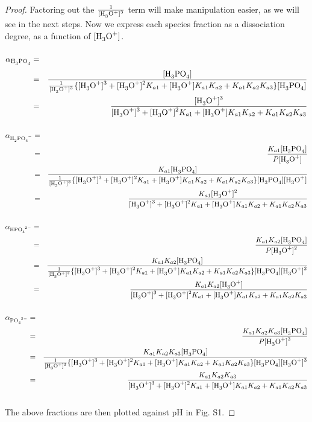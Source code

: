 \documentclass[a4paper,12pt,twocolumn]{article}
\begin{document}
\begin{proof}
	Factoring out the $\frac{1}{\ce{[H3O+]^3}}$ term will make manipulation easier, as we will see in the next steps. Now we express each species fraction as a dissociation degree, as a function of $\ce{[H3O+]}$.

 	\begin{eqnarray}
 		\alpha_{\ce{H3PO4}} & = & \frac{\ce{[H3PO4]}}{P} \hspace{-10cm} \nonumber \\
 		& = & \frac{\ce{[H3PO4]}}{\frac{1}{\ce{[H3O+]^3}} \{ \ce{[H3O+]^3} + \ce{[H3O+]^2}K_{a1} + \ce{[H3O+]}K_{a1}K_{a2} + K_{a1}K_{a2}K_{a3}\}\ce{[H3PO4]}} \nonumber \\
 		& = & \frac{\ce{[H3O+]^3}}{\ce{[H3O+]^3} + \ce{[H3O+]^2}K_{a1} + \ce{[H3O+]}K_{a1}K_{a2} + K_{a1}K_{a2}K_{a3}}
 		\end{eqnarray}

 	\begin{eqnarray}
 		\alpha_{\ce{H2PO4^{-}}} & = & \frac{\ce{[H2PO4^{-}]}}{P} \hspace{-10cm} \nonumber  \\
 		& = & \frac{K_{a1}\ce{[H3PO4]}}{P\ce{[H3O+]}} \nonumber \\
 		& = & \frac{K_{a1}\ce{[H3PO4]}}{\frac{1}{\ce{[H3O+]^3}} \{ \ce{[H3O+]^3} + \ce{[H3O+]^2}K_{a1} + \ce{[H3O+]}K_{a1}K_{a2} + K_{a1}K_{a2}K_{a3}\}\ce{[H3PO4][H3O+]}} \nonumber \\
 		& = & \frac{K_{a1}\ce{[H3O+]^2}}{\ce{[H3O+]^3} + \ce{[H3O+]^2}K_{a1} + \ce{[H3O+]}K_{a1}K_{a2} + K_{a1}K_{a2}K_{a3}}
 		\end{eqnarray}

 	\begin{eqnarray}
 		\alpha_{\ce{HPO4^{2-}}} & = & \frac{\ce{[HPO4^{2-}]}}{P} \hspace{-10cm} \nonumber  \\
 		& = & \frac{K_{a1}K_{a2}\ce{[H3PO4]}}{P\ce{[H3O+]^2}} \nonumber \\
 		& = & \frac{K_{a1}K_{a2}\ce{[H3PO4]}}{\frac{1}{\ce{[H3O+]^3}} \{ \ce{[H3O+]^3} + \ce{[H3O+]^2}K_{a1} + \ce{[H3O+]}K_{a1}K_{a2} + K_{a1}K_{a2}K_{a3}\}\ce{[H3PO4][H3O+]^2}} \nonumber \\
 		& = & \frac{K_{a1}K_{a2}\ce{[H3O+]}}{\ce{[H3O+]^3} + \ce{[H3O+]^2}K_{a1} + \ce{[H3O+]}K_{a1}K_{a2} + K_{a1}K_{a2}K_{a3}}
 		\end{eqnarray}

 	\begin{eqnarray}
 		\alpha_{\ce{PO4^{3-}}} & = & \frac{\ce{[PO4^{3-}]}}{P} \hspace{-10cm} \nonumber  \\
 		& = & \frac{K_{a1}K_{a2}K_{a3}\ce{[H3PO4]}}{P\ce{[H3O+]^3}} \nonumber \\
 		& = & \frac{K_{a1}K_{a2}K_{a3}\ce{[H3PO4]}}{\frac{1}{\ce{[H3O+]^3}} \{ \ce{[H3O+]^3} + \ce{[H3O+]^2}K_{a1} + \ce{[H3O+]}K_{a1}K_{a2} + K_{a1}K_{a2}K_{a3}\}\ce{[H3PO4][H3O+]^3}} \nonumber \\
 		& = & \frac{K_{a1}K_{a2}K_{a3}}{\ce{[H3O+]^3} + \ce{[H3O+]^2}K_{a1} + \ce{[H3O+]}K_{a1}K_{a2} + K_{a1}K_{a2}K_{a3}}
 		\end{eqnarray}
	\\[2\baselineskip]
	The above fractions are then plotted against pH in Fig. S1.


\end{proof}
\end{document}
